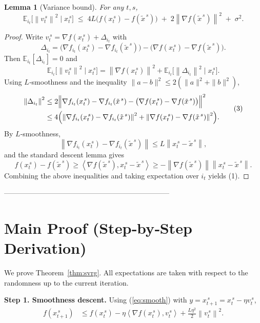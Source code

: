 \documentclass{article}
\newtheorem{lemma}{Lemma}
\newcommand{\E}{\mathbb{E}}
\newcommand{\norm}[1]{\left\|#1\right\|}
\newcommand{\inner}[2]{\left\langle #1,#2\right\rangle}
\begin{document}
\begin{lemma}[Variance bound]\label{lem:var}
For any $t,s$,
\[
\E_{i_t}\!\bigl[\norm{v_t^{\,s}}^{2}\mid x_t^{\,s}\bigr]
\;\le\;
4L\bigl(f(x_t^{\,s})-f(\tilde{x}^{\,s})\bigr)
\;+\;
2\norm{\nabla f(\tilde{x}^{\,s})}^{2}
\;+\;
\sigma^{2}.
\tag{1}
\]
\end{lemma}
\begin{proof}
Write $v_t^{\,s}=\nabla f(x_t^{\,s})+ \Delta_{i_t}$ with
\[
\Delta_{i_t}= \bigl(\nabla f_{i_t}(x_t^{\,s})-\nabla f_{i_t}(\tilde{x}^{\,s})\bigr)
-\bigl(\nabla f(x_t^{\,s})-\nabla f(\tilde{x}^{\,s})\bigr).
\]
Then $\E_{i_t}[\Delta_{i_t}]=0$ and
\[
\E_{i_t}\!\bigl[\norm{v_t^{\,s}}^{2}\mid x_t^{\,s}\bigr]
= \norm{\nabla f(x_t^{\,s})}^{2}
+ \E_{i_t}\!\bigl[\norm{\Delta_{i_t}}^{2}\mid x_t^{\,s}\bigr].
\tag{2}
\]
Using $L$‑smoothness and the inequality $\|a-b\|^2\le 2(\|a\|^2+\|b\|^2)$,
\[
\begin{aligned}
\norm{\Delta_{i_t}}^{2}
&\le 2\Bigl\|
\nabla f_{i_t}(x_t^{\,s})-\nabla f_{i_t}(\tilde{x}^{\,s})
- \bigl(\nabla f(x_t^{\,s})-\nabla f(\tilde{x}^{\,s})\bigr)
\Bigr\|^{2}\\
&\le 4\Bigl(\norm{\nabla f_{i_t}(x_t^{\,s})-\nabla f_{i_t}(\tilde{x}^{\,s})}^{2}
+\norm{\nabla f(x_t^{\,s})-\nabla f(\tilde{x}^{\,s})}^{2}\Bigr).
\end{aligned}
\tag{3}
\]
By $L$‑smoothness,
\[
\norm{\nabla f_{i_t}(x_t^{\,s})-\nabla f_{i_t}(\tilde{x}^{\,s})}\le L\norm{x_t^{\,s}-\tilde{x}^{\,s}},
\]
and the standard descent lemma gives
\[
f(x_t^{\,s})-f(\tilde{x}^{\,s})\ge\inner{\nabla f(\tilde{x}^{\,s})}{x_t^{\,s}-\tilde{x}^{\,s}}
\ge -\norm{\nabla f(\tilde{x}^{\,s})}\norm{x_t^{\,s}-\tilde{x}^{\,s}}.
\]
Combining the above inequalities and taking expectation over $i_t$ yields (1).  \tag*{\qedhere}
\end{proof}

---------------------------------------------------------------------

\section*{Main Proof (Step‑by‑Step Derivation)}
We prove Theorem~\ref{thm:svrg}.  All expectations are taken with respect to the randomness up to the current iteration.

\noindent\textbf{Step 1. Smoothness descent.}  
Using (\ref{eq:smooth}) with $y=x_{t+1}^{\,s}=x_t^{\,s}-\eta v_t^{\,s}$,
\[
\begin{aligned}
f(x_{t+1}^{\,s})
&\le f(x_t^{\,s})-\eta\inner{\nabla f(x_t^{\,s})}{v_t^{\,s}}
+\frac{L\eta^{2}}{2}\norm{v_t^{\,s}}^{2}.
\tag{4}
\end{aligned}
\]
\end{document}

